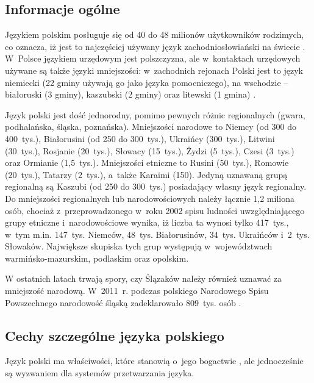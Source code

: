\begin{multicols}{2} 

\subsection{Informacje ogólne} 

Językiem polskim posługuje się od 40 do 48 milionów użytkowników
rodzimych, co oznacza, iż jest to najczęściej używany język
zachodniosłowiański na świecie \cite{Eur1}. W~Polsce językiem
urzędowym jest polszczyzna, ale w~kontaktach urzędowych używane są
także języki mniejszości: w~zachodnich rejonach Polski jest to
język niemiecki (22 gminy używają go jako języka pomocniczego), na
wschodzie -- białoruski (3 gminy), kaszubski (2 gminy) oraz litewski
(1 gmina) \cite{Efnil1}. 


Język polski jest dość jednorodny, pomimo pewnych różnic
regionalnych (gwara, podhalańska, śląska, poznańska).
Mniejszości narodowe to Niemcy (od 300 do 400~tys.), Białorusini (od
250 do 300~tys.), Ukraińcy (300~tys.), Litwini (30~tys.), Rosjanie
(20~tys.), Słowacy (15~tys.), Żydzi (5~tys.), Czesi (3~tys.) oraz
Ormianie (1,5~tys.). Mniejszości etniczne to Rusini (50~tys.),
Romowie (20~tys.), Tatarzy (2~tys.), a~także Karaimi (150). Jedyną
uznawaną grupą regionalną są Kaszubi (od 250 do 300~tys.)
posiadający własny język regionalny. Do mniejszości regionalnych
lub narodowościowych należy łącznie 1,2 miliona osób, chociaż
z~przeprowadzonego w~roku 2002 spisu ludności uwzględniającego
grupy etniczne i~narodowościowe wynika, iż liczba ta wynosi tylko
417~tys., w~tym m.in. 147~tys. Niemców, 48~tys. Białorusinów,
34~tys. Ukraińców i~2~tys. Słowaków. Największe skupiska tych
grup występują w~województwach warmińsko-mazurskim, podlaskim oraz
opolskim. 

W ostatnich latach trwają spory, czy Ślązaków należy również
uznawać za mniejszość narodową. W~2011~r. podczas polskiego
Narodowego Spisu Powszechnego narodowość śląską zadeklarowało
809~tys. osób \cite{gus1}. 

\subsection{Cechy szczególne języka polskiego} 

Język polski ma właściwości, które stanowią o~jego bogactwie
\cite{Pisarek2007}, ale jednocześnie są wyzwaniem dla systemów
przetwarzania języka. 


\end{multicols}
